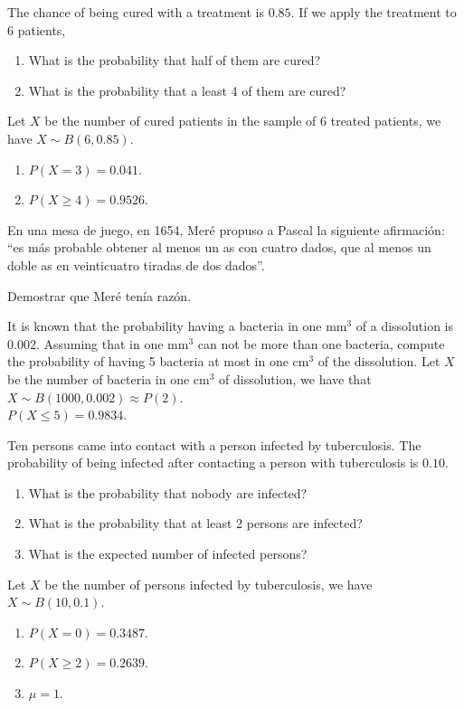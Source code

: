 {The chance of being cured with a treatment is $0.85$. 
If we apply the treatment to 6 patients,
\begin{enumerate}
\item What is the probability that half of them are cured?
\item What is the probability that a least 4 of them are cured?
\end{enumerate}
}
{Let $X$ be the number of cured patients in the sample of 6 treated patients, we have $X\sim B(6,0.85)$.
\begin{enumerate}
\item $P(X=3)=0.041$.
\item $P(X\geq 4)=0.9526$.
\end{enumerate}
}
{}


{En una mesa de juego, en 1654, Meré propuso a Pascal la siguiente afirmación: ``es más probable obtener al menos un as con cuatro dados, que al menos un doble as en veinticuatro tiradas de dos dados''.

Demostrar que Meré tenía razón.
}
{}
{}


{It is known that the probability having a bacteria in one mm$^3$ of a dissolution is $0.002$.
Assuming that in one mm$^3$ can not be more than one bacteria, compute the probability of having 5 bacteria at most in one cm$^3$ of the dissolution.}
{Let $X$ be the number of bacteria in one cm$^3$ of dissolution, we have that $X\sim B(1000,0.002)\approx P(2)$.\\
$P(X\leq 5)=0.9834$.
}
{}


{Ten persons came into contact with a person infected by tuberculosis. 
The probability of being infected after contacting a person with tuberculosis is $0.10$.
\begin{enumerate}
\item What is the probability that nobody are infected?
\item What is the probability that at least 2 persons are infected?
\item What is the expected number of infected persons? 
\end{enumerate}
}
{Let $X$ be the number of persons infected by tuberculosis, we have $X\sim B(10,0.1)$. 
\begin{enumerate}
\item $P(X=0)=0.3487$. 
\item $P(X\geq 2)=0.2639$.
\item $\mu=1$.
\end{enumerate}
}
{}


